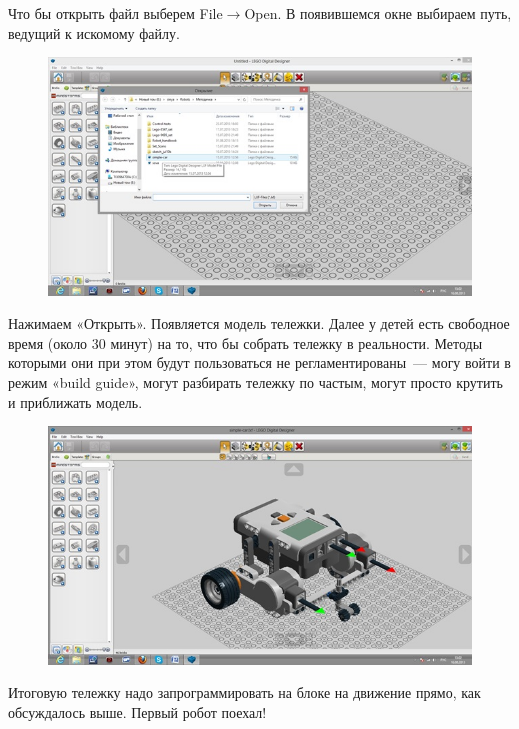 Что бы открыть файл выберем File\(\to\)Open. В появившемся окне выбираем путь, ведущий к искомому файлу.
\clearpage
\begin{figure}[h!]
	\begin{center}
		\includegraphics[width=0.95\linewidth]{chapters/chapter4/images/1}
		\caption{}
		\label{ris:image4x1}
	\end{center}
\end{figure}	 

Нажимаем «Открыть». Появляется модель тележки. Далее у детей есть свободное время (около 30 минут) на то, что бы собрать тележку в реальности. Методы которыми они при этом будут пользоваться не регламентированы~--- могу войти в режим «build guide», могут разбирать тележку по частым, могут просто крутить и приближать модель.

\begin{figure}[h!]
	\begin{center}
		\includegraphics[width=0.95\linewidth]{chapters/chapter4/images/2}
		\caption{}
		\label{ris:image4x2}
	\end{center}
\end{figure}	

Итоговую тележку надо запрограммировать на блоке на движение прямо, как обсуждалось выше. Первый робот поехал!